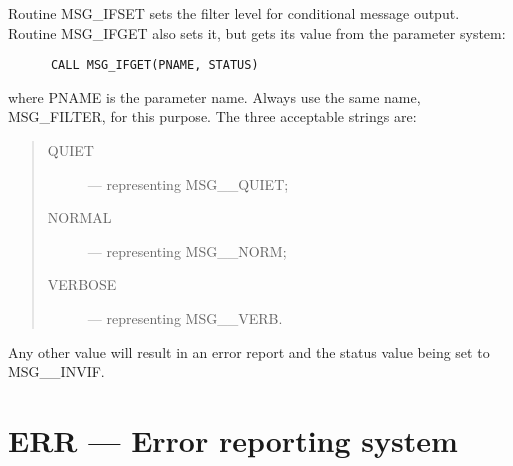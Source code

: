 Routine MSG\_IFSET sets the filter level for conditional message output.
Routine MSG\_IFGET also sets it, but gets its value from the parameter system:

\begin{small}
\begin{verbatim}
      CALL MSG_IFGET(PNAME, STATUS)
\end{verbatim}
\end{small}

where PNAME is the parameter name.
Always use the same name, MSG\_FILTER, for this purpose.
The three acceptable strings are:
\begin {quote}
\begin {description}
\item [QUIET] --- representing MSG\_\_QUIET;
\item [NORMAL] --- representing MSG\_\_NORM;
\item [VERBOSE] --- representing MSG\_\_VERB.
\end {description}
\end {quote}
Any other value will result in an error report and the status value being
set to MSG\_\_INVIF.

\section{ERR --- Error reporting system}

